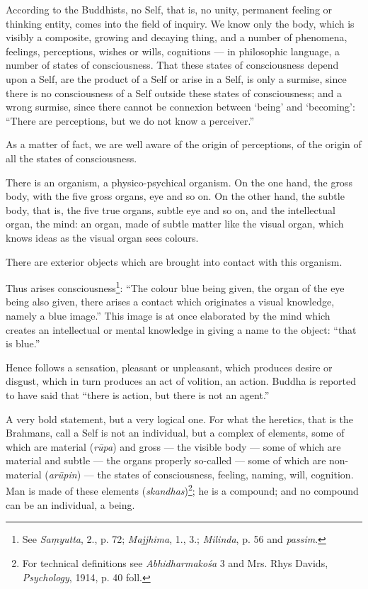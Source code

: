 \documentclass[a4paper, 11pt, oneside, english, landscape]{article}
\begin{document}
According to the Buddhists, no Self, that is, no unity, permanent feeling or thinking entity, comes into the field of inquiry. We know only the body, which is visibly a composite, growing and decaying thing, and a number of phenomena, feelings, perceptions, wishes or wills, cognitions --- in philosophic language, a number of states of consciousness. That these states of consciousness depend upon a Self, are the product of a Self or arise in a Self, is only a surmise, since there is no consciousness of a Self outside these states of consciousness; and a wrong surmise, since there cannot be connexion between `being' and `becoming': ``There are perceptions, but we do not know a perceiver.''

As a matter of fact, we are well aware of the origin of perceptions, of the origin of all the states of consciousness.

There is an organism, a physico-psychical organism. On the one hand, the gross body, with the five gross organs, eye and so on. On the other hand, the subtle body, that is, the five true organs, subtle eye and so on, and the intellectual organ, the mind: an organ, made of subtle matter like the visual organ, which knows ideas as the visual organ sees colours.

There are exterior objects which are brought into contact with this organism.

Thus arises consciousness\footnote{See \emph{Saṃyutta}, 2., p. 72; \emph{Majjhima}, 1., 3.; \emph{Milinda}, p. 56 and \emph{passim}.}: ``The colour blue being given, the organ of the eye being also given, there arises a contact which originates a visual knowledge, namely a blue image.'' This image is at once elaborated by the mind which creates an intellectual or mental knowledge in giving a name to the object: ``that is blue.''

Hence follows a sensation, pleasant or unpleasant, which produces desire or disgust, which in turn produces an act of volition, an action. Buddha is reported to have said that ``there is action, but there is not an agent.''

A very bold statement, but a very logical one. For what the heretics, that is the Brahmans, call a Self is not an individual, but a complex of elements, some of which are material (\emph{rūpa}) and gross --- the visible body --- some of which are material and subtle --- the organs properly so-called --- some of which are non-material (\emph{arūpin}) --- the states of consciousness, feeling, naming, will, cognition. Man is made of these elements (\emph{skandhas})\footnote{For technical definitions see \emph{Abhidharmakośa} 3 and Mrs. Rhys Davids, \emph{Psychology}, 1914, p. 40 foll.}; he is a compound; and no compound can be an individual, a being.
\end{document}
